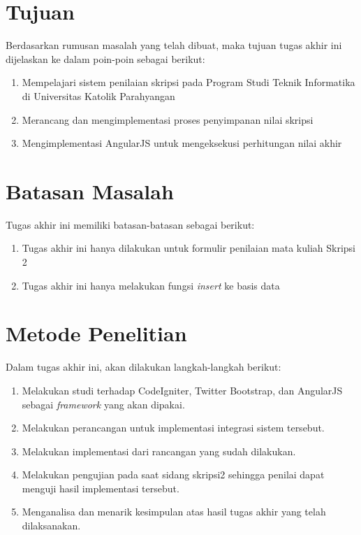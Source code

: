 \section{Tujuan}
\label{sec: tujuan}

	Berdasarkan rumusan masalah yang telah dibuat, maka tujuan tugas akhir ini dijelaskan ke dalam poin-poin sebagai berikut:
	\begin{enumerate}
		\item Mempelajari sistem penilaian skripsi pada Program Studi Teknik Informatika di Universitas Katolik Parahyangan
		\item Merancang dan mengimplementasi proses penyimpanan nilai skripsi
		\item Mengimplementasi AngularJS untuk mengeksekusi perhitungan nilai akhir
	\end{enumerate}
	
\section{Batasan Masalah}
\label{sec: batasanMasalah}
	
	Tugas akhir ini memiliki batasan-batasan sebagai berikut:
	
	\begin{enumerate}
		\item Tugas akhir ini hanya dilakukan untuk formulir penilaian mata kuliah Skripsi 2
		\item Tugas akhir ini hanya melakukan fungsi \textit{insert} ke basis data
	\end{enumerate}
	
\section{Metode Penelitian}
\label{sec: metodePenelitian}

Dalam tugas akhir ini, akan dilakukan langkah-langkah berikut:

\begin{enumerate}
	\item Melakukan studi terhadap CodeIgniter, Twitter Bootstrap, dan AngularJS sebagai \textit{framework} yang akan dipakai.
	\item Melakukan perancangan untuk implementasi integrasi sistem tersebut.
	\item Melakukan implementasi dari rancangan yang sudah dilakukan.
	\item Melakukan pengujian pada saat sidang skripsi2 sehingga penilai dapat menguji hasil implementasi tersebut.
	\item Menganalisa dan menarik kesimpulan atas hasil tugas akhir yang telah dilaksanakan.
\end{enumerate}
	
